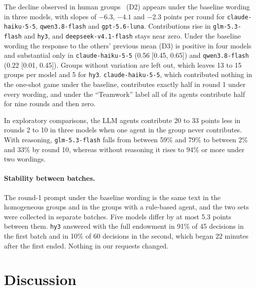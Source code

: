 \documentclass[runningheads]{llncs}
\begin{document}
The decline observed in human groups~\cite{fischbacher2010social} (D2) appears under the baseline wording in three models, with slopes of $-6.3$, $-4.1$ and $-2.3$ points per round for \texttt{claude-haiku-5-5}, \texttt{qwen3.8-flash} and \texttt{gpt-5.6-luna}. Contributions rise in \texttt{glm-5.3-flash} and \texttt{hy3}, and \texttt{deepseek-v4.1-flash} stays near zero. Under the baseline wording the response to the others' previous mean (D3) is positive in four models and substantial only in \texttt{claude-haiku-5-5} (0.56 [0.45, 0.65]) and \texttt{qwen3.8-flash} (0.22 [0.01, 0.45]). Groups without variation are left out, which leaves 13 to 15 groups per model and 5 for \texttt{hy3}. \texttt{claude-haiku-5-5}, which contributed nothing in the one-shot game under the baseline, contributes exactly half in round 1 under every wording, and under the ``Teamwork'' label all of its agents contribute half for nine rounds and then zero.

In exploratory comparisons, the LLM agents contribute 20 to 33 points less in rounds 2 to 10 in three models when one agent in the group never contributes. With reasoning, \texttt{glm-5.3-flash} falls from between 59\% and 79\% to between 2\% and 33\% by round 10, whereas without reasoning it rises to 94\% or more under two wordings.

\paragraph{Stability between batches.} The round-1 prompt under the baseline wording is the same text in the homogeneous groups and in the groups with a rule-based agent, and the two sets were collected in separate batches. Five models differ by at most 5.3 points between them. \texttt{hy3} answered with the full endowment in 91\% of 45 decisions in the first batch and in 10\% of 60 decisions in the second, which began 22 minutes after the first ended. Nothing in our requests changed.

\section{Discussion}
\end{document}
